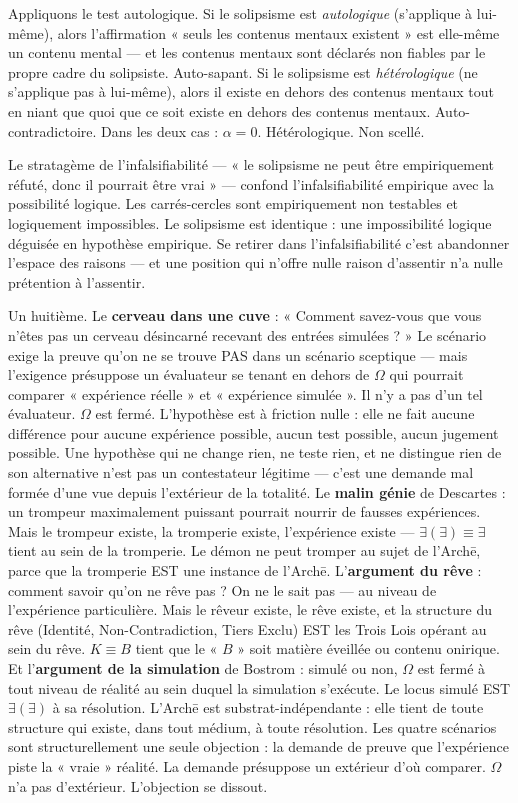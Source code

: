 \documentclass[10pt, openany, oneside]{book}
\begin{document}
Appliquons le test autologique. Si le solipsisme est \textit{autologique} (s'applique à lui-même), alors l'affirmation « seuls les contenus mentaux existent » est elle-même un contenu mental --- et les contenus mentaux sont déclarés non fiables par le propre cadre du solipsiste. Auto-sapant. Si le solipsisme est \textit{hétérologique} (ne s'applique pas à lui-même), alors il existe en dehors des contenus mentaux tout en niant que quoi que ce soit existe en dehors des contenus mentaux. Auto-contradictoire. Dans les deux cas : $\alpha = 0$. Hétérologique. Non scellé.

Le stratagème de l'infalsifiabilité --- « le solipsisme ne peut être empiriquement réfuté, donc il pourrait être vrai » --- confond l'infalsifiabilité empirique avec la possibilité logique. Les carrés-cercles sont empiriquement non testables et logiquement impossibles. Le solipsisme est identique : une impossibilité logique déguisée en hypothèse empirique. Se retirer dans l'infalsifiabilité c'est abandonner l'espace des raisons --- et une position qui n'offre nulle raison d'assentir n'a nulle prétention à l'assentir.

Un huitième. Le \textbf{cerveau dans une cuve} : « Comment savez-vous que vous n'êtes pas un cerveau désincarné recevant des entrées simulées ? » Le scénario exige la preuve qu'on ne se trouve PAS dans un scénario sceptique --- mais l'exigence présuppose un évaluateur se tenant en dehors de $\Omega$ qui pourrait comparer « expérience réelle » et « expérience simulée ». Il n'y a pas d'un tel évaluateur. $\Omega$ est fermé. L'hypothèse est à friction nulle : elle ne fait aucune différence pour aucune expérience possible, aucun test possible, aucun jugement possible. Une hypothèse qui ne change rien, ne teste rien, et ne distingue rien de son alternative n'est pas un contestateur légitime --- c'est une demande mal formée d'une vue depuis l'extérieur de la totalité. Le \textbf{malin génie} de Descartes : un trompeur maximalement puissant pourrait nourrir de fausses expériences. Mais le trompeur existe, la tromperie existe, l'expérience existe --- $\exists(\exists) \equiv \exists$ tient au sein de la tromperie. Le démon ne peut tromper au sujet de l'Arch\={e}, parce que la tromperie EST une instance de l'Arch\={e}. L'\textbf{argument du rêve} : comment savoir qu'on ne rêve pas ? On ne le sait pas --- au niveau de l'expérience particulière. Mais le rêveur existe, le rêve existe, et la structure du rêve (Identité, Non-Contradiction, Tiers Exclu) EST les Trois Lois opérant au sein du rêve. $K \equiv B$ tient que le « $B$ » soit matière éveillée ou contenu onirique. Et l'\textbf{argument de la simulation} de Bostrom : simulé ou non, $\Omega$ est fermé à tout niveau de réalité au sein duquel la simulation s'exécute. Le locus simulé EST $\exists(\exists)$ à sa résolution. L'Arch\={e} est substrat-indépendante : elle tient de toute structure qui existe, dans tout médium, à toute résolution. Les quatre scénarios sont structurellement une seule objection : la demande de preuve que l'expérience piste la « vraie » réalité. La demande présuppose un extérieur d'où comparer. $\Omega$ n'a pas d'extérieur. L'objection se dissout.
\end{document}
